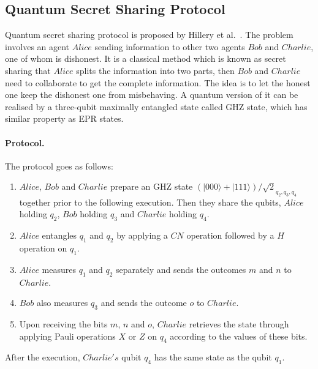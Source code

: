 \documentclass[a4paper,runningheads]{llncs}
\begin{document}
\subsection{Quantum Secret Sharing Protocol}
Quantum secret sharing protocol is proposed by Hillery et al.~\cite{hillery1999quantum}. The problem involves an agent $Alice$ sending information to other two agents $Bob$ and $Charlie$, one of whom is dishonest. It is a classical method which is known as secret sharing that $Alice$ splits the information into two parts, then $Bob$ and $Charlie$ need to collaborate to get the complete information. The idea is to let the honest one keep the dishonest one from misbehaving. A quantum version of it can be realised by a three-qubit maximally entangled state called GHZ state, which has similar property as EPR states. 
\paragraph{Protocol.}
The protocol goes as follows:
\begin{enumerate}
	\item $Alice$, $Bob$ and $Charlie$ prepare an GHZ state $(|000\rangle+|111\rangle)/\sqrt{2}_{q_2,q_3,q_4}$ together prior to the following execution. Then they share the qubits, $Alice$ holding $q_2$, $Bob$ holding $q_3$ and $Charlie$ holding $q_4$.
	\item $Alice$ entangles $q_1$ and $q_2$ by applying a $CN$ operation followed by a $H$ operation on $q_1$.
	\item $Alice$ measures $q_1$ and $q_2$ separately and sends the outcomes $m$ and $n$ to $Charlie$.
	\item $Bob$ also measures $q_3$ and sends the outcome $o$ to $Charlie$.
	\item Upon receiving the bits $m$, $n$ and $o$, $Charlie$ retrieves the state through applying Pauli operations $X$ or $Z$ on $q_4$ according to the values of these bits.
\end{enumerate}
After the execution, $Charlie's$ qubit $q_4$ has the same state as the qubit $q_1$.
\end{document}
